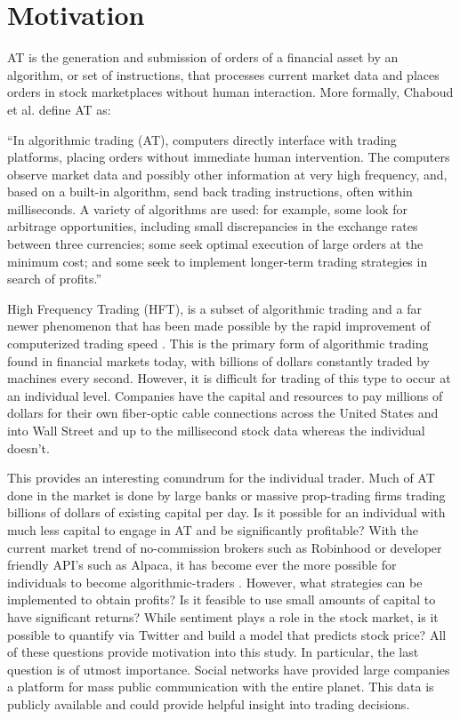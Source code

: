 \documentclass[../thesis.tex]{subfiles}
\begin{document}

\section{Motivation}

AT is the generation and submission of orders of a financial asset by an algorithm, or set of instructions, that processes current market data and places orders in stock marketplaces without human interaction. More formally, Chaboud et al. \cite{Chaboud2009} define AT as: \begin{displayquote} ``In algorithmic trading (AT), computers directly interface with trading platforms, placing orders without immediate human intervention. The computers observe market data and possibly other information at very high frequency, and, based on a built-in algorithm, send back trading instructions, often within milliseconds. A variety of algorithms are used: for example, some look for arbitrage opportunities,
including small discrepancies in the exchange rates between three currencies; some
seek optimal execution of large orders at the minimum cost; and some seek to
implement longer-term trading strategies in search of profits.'' \end{displayquote}

High Frequency Trading (HFT), is a subset of algorithmic trading and a far newer phenomenon that has been made possible by the rapid improvement of computerized trading speed \cite{Gomber2011}. This is the primary form of algorithmic trading found in financial markets today, with billions of dollars constantly traded by machines every second. However, it is difficult for trading of this type to occur at an individual level. Companies have the capital and resources to pay millions of dollars for their own fiber-optic cable connections across the United States and into Wall Street and up to the millisecond stock data whereas the individual doesn't. 

This provides an interesting conundrum for the individual trader. Much of AT done in the market is done by large banks or massive prop-trading firms trading billions of dollars of existing capital per day. Is it possible for an individual with much less capital to engage in AT and be significantly profitable? With the current market trend of no-commission brokers such as Robinhood or developer friendly API's such as Alpaca, it has become ever the more possible for individuals to become algorithmic-traders \cite{Alpaca}. However, what strategies can be implemented to obtain profits? Is it feasible to use small amounts of capital to have significant returns? While sentiment plays a role in the stock market, is it possible to quantify via Twitter and build a model that predicts stock price? All of these questions provide motivation into this study. In particular, the last question is of utmost importance. Social networks have provided large companies a platform for mass public communication with the entire planet. This data is publicly available and could provide helpful insight into trading decisions. 
\end{document}
